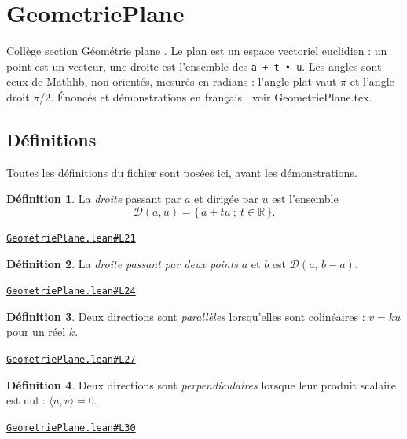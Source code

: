 \documentclass[11pt,a4paper]{article}
\theoremstyle{definition}
\newtheorem{definition}{Définition}
\theoremstyle{plain}
\newcommand{\source}[2]{\par\smallskip\noindent\hfill{\footnotesize\href{#1}{\texttt{#2}}}\par\smallskip}
\begin{document}
\section{GeometriePlane}

\noindent
Collège \textemdash{} section \og{} Géométrie plane \fg{}.
Le plan est un espace vectoriel euclidien : un point est un vecteur, une droite est
l'ensemble des \texttt{a + t • u}. Les angles sont ceux de Mathlib, non orientés, mesurés en
radians : l'angle plat vaut \(\pi\) et l'angle droit \(\pi\)/2.
Énoncés et démonstrations en français : voir GeometriePlane.tex.

\subsection{Définitions}

\noindent
Toutes les définitions du fichier sont posées ici, avant les démonstrations.

\begin{definition}
La \emph{droite} passant par $a$ et dirigée par $u$ est l'ensemble
\[ \mathcal{D}(a, u) = \{\, a + tu \ ;\ t \in \mathbb{R} \,\} . \]
\end{definition}
\source{https://github.com/Commutator-IO/learn-lean/blob/main/courses/01-college/02-geometrie-plane/GeometriePlane.lean\#L21}{GeometriePlane.lean\#L21}

\begin{definition}
La \emph{droite passant par deux points} $a$ et $b$ est $\mathcal{D}(a,\, b - a)$.
\end{definition}
\source{https://github.com/Commutator-IO/learn-lean/blob/main/courses/01-college/02-geometrie-plane/GeometriePlane.lean\#L24}{GeometriePlane.lean\#L24}

\begin{definition}
Deux directions sont \emph{parallèles} lorsqu'elles sont colinéaires : $v = ku$ pour un
réel $k$.
\end{definition}
\source{https://github.com/Commutator-IO/learn-lean/blob/main/courses/01-college/02-geometrie-plane/GeometriePlane.lean\#L27}{GeometriePlane.lean\#L27}

\begin{definition}
Deux directions sont \emph{perpendiculaires} lorsque leur produit scalaire est nul :
$\langle u, v\rangle = 0$.
\end{definition}
\source{https://github.com/Commutator-IO/learn-lean/blob/main/courses/01-college/02-geometrie-plane/GeometriePlane.lean\#L30}{GeometriePlane.lean\#L30}
\end{document}
